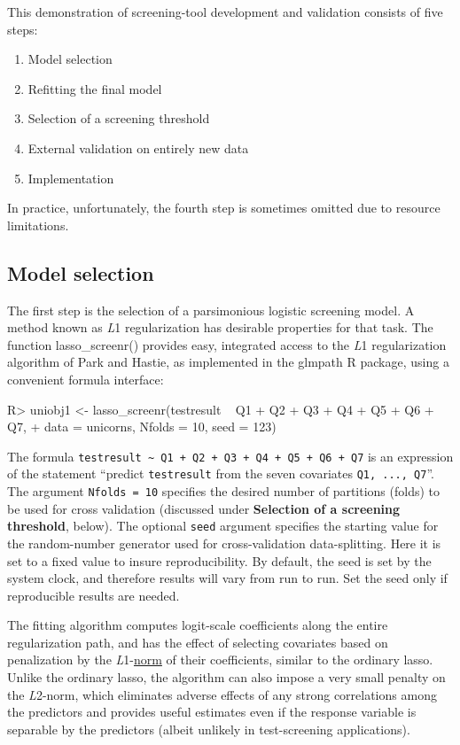 \documentclass[11pt]{report}
\renewenvironment{Schunk}{\vspace{\topsep}}{\vspace{\topsep}}
\begin{document}
This demonstration of screening-tool development and
validation consists of five steps:
\begin{enumerate}
\item Model selection
\item Refitting the final model
\item Selection of a screening threshold
\item External validation on entirely new data
\item Implementation
\end{enumerate}

In practice, unfortunately, the fourth step is sometimes omitted due to
resource limitations.

\subsection*{Model selection}

The first step is the selection of a parsimonious logistic screening
model.  A method known as \emph{L}1 regularization has desirable
properties for that task\citep{Hastie+al2009,Park+Hastie2007}.  The
function \textsf{lasso\_screenr()} provides easy, integrated access to
the \emph{L}1 regularization algorithm of Park and
Hastie\citep{Park+Hastie2007}, as implemented in the \textsf{glmpath}
\textsf{R} package, using a convenient formula interface:
\begin{Schunk}
\begin{Sinput}
R> uniobj1 <- lasso_screenr(testresult ~ Q1 + Q2 + Q3 + Q4 + Q5 + Q6 + Q7,
+                          data = unicorns, Nfolds = 10, seed = 123)
\end{Sinput}
\end{Schunk}

The formula \verb|testresult ~ Q1 + Q2 + Q3 + Q4 + Q5 + Q6 + Q7| is an
expression of the statement ``predict \verb|testresult| from the seven
covariates \verb|Q1, ..., Q7|''. The argument \verb|Nfolds = 10|
specifies the desired number of partitions (folds) to be used for
cross validation (discussed under \textbf{Selection of a screening
threshold}, below).  The optional \verb|seed| argument specifies the starting value
for the random-number generator used for cross-validation data-splitting. Here
it is set to a fixed value to insure reproducibility. By default, the
seed is set by the system clock, and therefore results will vary from
run to run. Set the seed only if reproducible results are needed.

The fitting algorithm computes logit-scale coefficients along the
entire regularization path, and has the effect of selecting covariates
based on penalization by the
\emph{L}1-\href{https://towardsdatascience.com/norms-penalties-and-multitask-learning-2f1db5f97c1f}{norm}
of their coefficients, similar to the ordinary
lasso\citep{Hastie+al2009}.  Unlike the ordinary lasso, the
algorithm can also impose a very small penalty on the \emph{L}2-norm,
which eliminates adverse effects of any strong correlations among the
predictors and provides useful estimates even if the response variable
is separable by the predictors (albeit unlikely in test-screening
applications).
\end{document}
